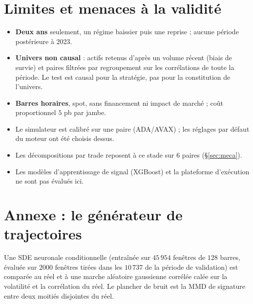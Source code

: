 \documentclass[11pt,a4paper]{article}
\theoremstyle{remark}
\begin{document}
\section{Limites et menaces à la validité}\label{sec:limites}

\begin{itemize}[nosep]
\item \textbf{Deux ans} seulement, un régime baissier puis une reprise ; aucune période postérieure à 2023.
\item \textbf{Univers non causal} : actifs retenus d'après un volume récent (biais de survie) et paires filtrées par regroupement sur les corrélations de toute la période. Le test est causal pour la stratégie, pas pour la constitution de l'univers.
\item \textbf{Barres horaires}, spot, sans financement ni impact de marché ; coût proportionnel $5$ pb par jambe.
\item Le simulateur est calibré sur une paire (ADA/AVAX) ; les réglages par défaut du moteur ont été choisis dessus.
\item Les décompositions par trade reposent à ce stade sur $6$ paires (\S\ref{sec:meca}).
\item Les modèles d'apprentissage de signal (XGBoost) et la plateforme d'exécution ne sont pas évalués ici.
\end{itemize}

\section{Annexe : le générateur de trajectoires}\label{sec:gen}

Une SDE neuronale conditionnelle (entraînée sur $45\,954$ fenêtres de $128$ barres, évaluée sur $2000$ fenêtres tirées dans les $10\,737$ de la période de validation) est comparée au réel
et à une marche aléatoire gaussienne corrélée calée sur la volatilité et la corrélation du réel. Le plancher de bruit est la MMD de signature entre deux moitiés disjointes du réel.
\end{document}
